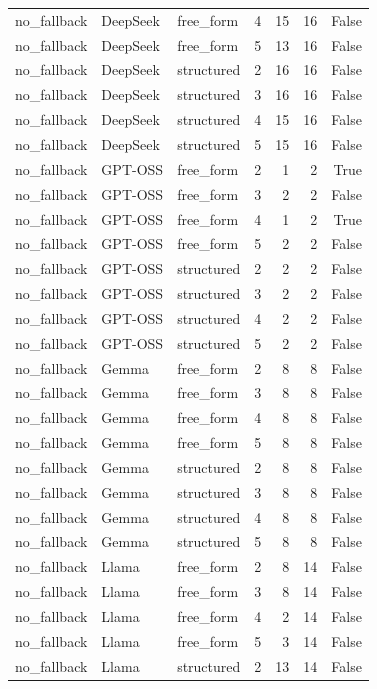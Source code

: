 \begin{longtable}{lllrrrr}
no\_fallback & DeepSeek & free\_form & 4 & 15 & 16 & False \\
no\_fallback & DeepSeek & free\_form & 5 & 13 & 16 & False \\
no\_fallback & DeepSeek & structured & 2 & 16 & 16 & False \\
no\_fallback & DeepSeek & structured & 3 & 16 & 16 & False \\
no\_fallback & DeepSeek & structured & 4 & 15 & 16 & False \\
no\_fallback & DeepSeek & structured & 5 & 15 & 16 & False \\
no\_fallback & GPT-OSS & free\_form & 2 & 1 & 2 & True \\
no\_fallback & GPT-OSS & free\_form & 3 & 2 & 2 & False \\
no\_fallback & GPT-OSS & free\_form & 4 & 1 & 2 & True \\
no\_fallback & GPT-OSS & free\_form & 5 & 2 & 2 & False \\
no\_fallback & GPT-OSS & structured & 2 & 2 & 2 & False \\
no\_fallback & GPT-OSS & structured & 3 & 2 & 2 & False \\
no\_fallback & GPT-OSS & structured & 4 & 2 & 2 & False \\
no\_fallback & GPT-OSS & structured & 5 & 2 & 2 & False \\
no\_fallback & Gemma & free\_form & 2 & 8 & 8 & False \\
no\_fallback & Gemma & free\_form & 3 & 8 & 8 & False \\
no\_fallback & Gemma & free\_form & 4 & 8 & 8 & False \\
no\_fallback & Gemma & free\_form & 5 & 8 & 8 & False \\
no\_fallback & Gemma & structured & 2 & 8 & 8 & False \\
no\_fallback & Gemma & structured & 3 & 8 & 8 & False \\
no\_fallback & Gemma & structured & 4 & 8 & 8 & False \\
no\_fallback & Gemma & structured & 5 & 8 & 8 & False \\
no\_fallback & Llama & free\_form & 2 & 8 & 14 & False \\
no\_fallback & Llama & free\_form & 3 & 8 & 14 & False \\
no\_fallback & Llama & free\_form & 4 & 2 & 14 & False \\
no\_fallback & Llama & free\_form & 5 & 3 & 14 & False \\
no\_fallback & Llama & structured & 2 & 13 & 14 & False \\

\end{longtable}
